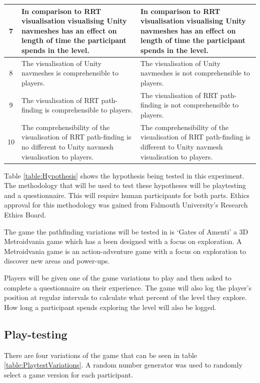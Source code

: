 \documentclass[journal]{IEEEtran}
\begin{document}
\begin{table}[h]
\begin{tabular}{|c|p{7.5cm}|p{7.5cm}|}
			7 &  In comparison to RRT visualisation visualising Unity navmeshes has an effect on length of time the participant spends in the level.         
			&   In comparison to RRT visualisation visualising Unity navmeshes has an effect on length of time the participant spends in the level.     
			\\ \hline
			
			8 &   The visualisation of  Unity navmeshes is comprehensible to players.
			&  The visualisation of  Unity navmeshes is not comprehensible to players.
			\\ \hline
			
			9 &  The visualisation of  RRT path-finding is comprehensible to players.
			&  The visualisation of  RRT path-finding is not comprehensible to players.
			\\ \hline
			
			10 &  The comprehensibility of the visualisation of RRT path-finding is no different to Unity navmesh visualisation to players.
			&  The comprehensibility of the visualisation of RRT path-finding is different to Unity navmesh visualisation to players.
			\\ \hline
		\end{tabular}
	\end{table}
	Table \ref{table:Hypothesis} shows the hypothesis being tested in this experiment. The methodology that will be used to test these hypotheses will be playtesting and a questionnaire. This will require human participants for both parts. Ethics approval for this methodology was gained from Falmouth University’s Research Ethics Board.
	
	The game the pathfinding variations will be tested in is `Gates of Amenti' a 3D Metroidvania game which has a been designed with a focus on exploration. A Metroidvania game is an action-adventure game with a focus on exploration to discover new areas and power-ups.
	
	Players will be given one of the game variations to play and then asked to complete a questionnaire on their experience. The game will also log the player's position at regular intervals to calculate what percent of the level they explore. How long a participant spends exploring the level will also be logged.
	
	\subsection{Play-testing}
	There are four variations of the game that can be seen in table \ref{table:PlaytestVariations}.  A random number generator was used to randomly select a game version for each participant.
	
\end{document}
